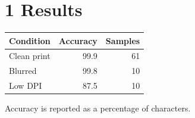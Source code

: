 \documentclass{article}
\begin{document}
\section*{1 Results}

\begin{tabular}{lrr}
\toprule
Condition & Accuracy & Samples \\
\midrule
Clean print & 99.9 & 61 \\
Blurred & 99.8 & 10 \\
Low DPI & 87.5 & 10 \\
\bottomrule
\end{tabular}

\vspace{1em}
Accuracy is reported as a percentage of characters.
\end{document}
